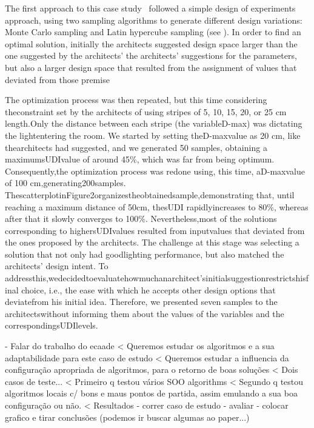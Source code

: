 The first approach to this case study~\cite{Caetano2018} followed a simple design of experiments approach, using two sampling algorithms to generate different design variations: Monte Carlo sampling and Latin hypercube sampling (see ). In order to find an optimal solution, initially the architects suggested 
design space larger than the one suggested by the architects' the architects’ suggestions for the parameters, but also a larger design space that resulted from the assignment of values that deviated from those premise

The optimization process was then repeated, but this time considering theconstraint set by the architects of using stripes of 5, 10, 15, 20, or 25 cm length.Only the distance between each stripe (the variableD-max) was dictating the lightentering the room. We started by setting theD-maxvalue as 20 cm, like thearchitects had suggested, and we generated 50 samples, obtaining a maximumsUDIvalue of around 45\%, which was far from being optimum. Consequently,the optimization process was redone using, this time, aD-maxvalue of 100 cm,generating200samples. ThescatterplotinFigure2organizestheobtainedsample,demonstrating that, until reaching a maximum distance of 50cm, thesUDI rapidlyincreases to 80\%, whereas after that it slowly converges to 100\%. Nevertheless,most of the solutions corresponding to highersUDIvalues resulted from inputvalues that deviated from the ones proposed by the architects. 
The challenge at this stage was selecting a solution that not only had goodlighting performance, but also matched the architects’ design intent. To addressthis,wedecidedtoevaluatehowmuchanarchitect’sinitialsuggestionrestrictshisfinal choice, i.e., the ease with which he accepts other design options that deviatefrom his initial idea. Therefore, we presented seven samples to the architectswithout informing them about the values of the variables and the correspondingsUDIlevels. 


- Falar do trabalho do ecaade
< Queremos estudar os algoritmos e a sua adaptabilidade para este caso de estudo
< Queremos estudar a influencia da configuração apropriada de algoritmos, para o retorno de boas soluções
< Dois casos de teste...
< Primeiro q testou vários \ac{SOO} algorithms
< Segundo q testou algoritmos locais c/ bons e maus pontos de partida, assim emulando a sua boa configuração ou não. 
< Resultados
- correr caso de estudo 
- avaliar 
- colocar grafico e tirar conclusões (podemos ir buscar algumas ao paper...)

